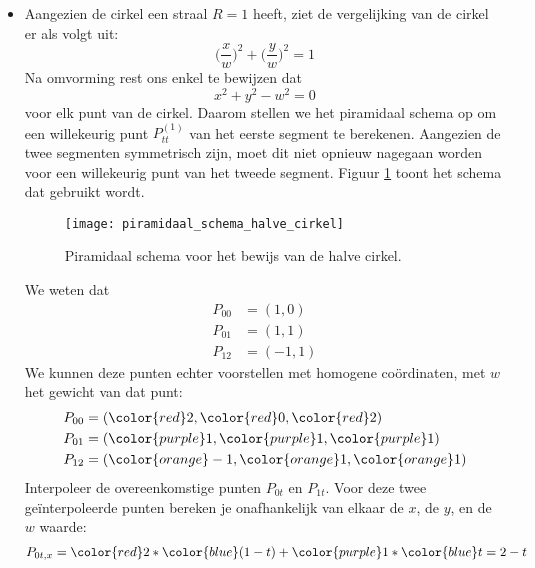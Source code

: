 \documentclass{report}
\begin{document}
\begin{enumerate}
			
	{
		\begin{itemize} 
			\item Aangezien de cirkel een straal $R=1$ heeft, ziet de vergelijking van de cirkel er als volgt uit:
			$$\bigg(\frac{x}{w}\bigg)^2 + \bigg(\frac{y}{w}\bigg)^2 = 1$$
			Na omvorming rest ons enkel te bewijzen dat
			$$x^2 + y^2 - w^2 = 0$$ voor elk punt van de cirkel. Daarom stellen we het piramidaal schema op om een willekeurig punt $P_{tt}^{(1)}$ van het eerste segment te berekenen. Aangezien de twee segmenten symmetrisch zijn, moet dit niet opnieuw nagegaan worden voor een willekeurig punt van het tweede segment. Figuur \ref{fig:piramidaal_schema_halve_cirkel} toont het schema dat gebruikt wordt.
			\begin{figure}[ht]
				\centering
				\texttt{[image: piramidaal\_schema\_halve\_cirkel]}
				\caption{Piramidaal schema voor het bewijs van de halve cirkel.}
				\label{fig:piramidaal_schema_halve_cirkel}
			\end{figure}
			 We weten dat 
			\begin{equation*}
				\begin{split}
					P_{00} & = (1, 0) \\
					P_{01} & = (1, 1) \\
					P_{12} & = (-1, 1)
				\end{split}
			\end{equation*}
			We kunnen deze punten echter voorstellen met homogene coördinaten, met $w$ het gewicht van dat punt:
			\begin{equation*}
				\begin{split}
					P_{00} & = ({\color{red}2}, {\color{red}0}, {\color{red}2}) \\
					P_{01} & = ({\color{purple}1}, {\color{purple}1}, {\color{purple}1}) \\
					P_{12} & = ({\color{orange}-1}, {\color{orange}1}, {\color{orange}1}) \\
				\end{split}
			\end{equation*}
			Interpoleer de overeenkomstige punten $P_{0t}$ en $P_{1t}$. Voor deze twee geïnterpoleerde punten bereken je onafhankelijk van elkaar de $x$, de $y$, en de $w$ waarde:
			\begin{equation*}
				\begin{split}
					P_{0t, x} & = {\color{red}2} * {\color{blue}(1 - t)} + {\color{purple}1} * {\color{blue}t} = 2 - t \\

\end{split}
\end{equation*}
\end{itemize}}
\end{enumerate}
\end{document}
